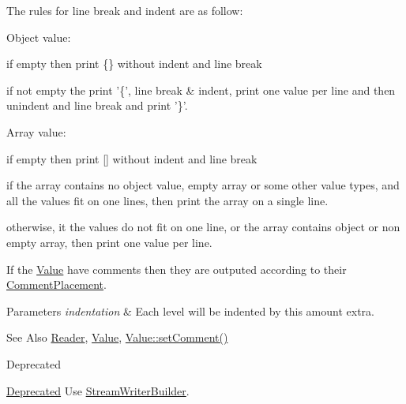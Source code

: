 The rules for line break and indent are as follow\-:
\begin{DoxyItemize}
\item Object value\-:
\begin{DoxyItemize}
\item if empty then print \{\} without indent and line break
\item if not empty the print '\{', line break \& indent, print one value per line and then unindent and line break and print '\}'.
\end{DoxyItemize}
\item Array value\-:
\begin{DoxyItemize}
\item if empty then print \mbox{[}\mbox{]} without indent and line break
\item if the array contains no object value, empty array or some other value types, and all the values fit on one lines, then print the array on a single line.
\item otherwise, it the values do not fit on one line, or the array contains object or non empty array, then print one value per line.
\end{DoxyItemize}
\end{DoxyItemize}

If the \hyperlink{class_json_1_1_value}{Value} have comments then they are outputed according to their \hyperlink{namespace_json_a4fc417c23905b2ae9e2c47d197a45351}{Comment\-Placement}.


\begin{DoxyParams}{Parameters}
{\em indentation} & Each level will be indented by this amount extra. \\
\hline
\end{DoxyParams}
\begin{DoxySeeAlso}{See Also}
\hyperlink{class_json_1_1_reader}{Reader}, \hyperlink{class_json_1_1_value}{Value}, \hyperlink{class_json_1_1_value_a29f3a30f7e5d3af6f38d57999bf5b480}{Value\-::set\-Comment()} 
\end{DoxySeeAlso}
\begin{DoxyRefDesc}{Deprecated}
\item[\hyperlink{deprecated__deprecated000010}{Deprecated}]Use \hyperlink{class_json_1_1_stream_writer_builder}{Stream\-Writer\-Builder}. \end{DoxyRefDesc}


